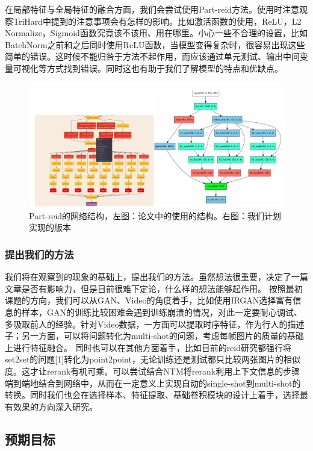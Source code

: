 在局部特征与全局特征的融合方面，我们会尝试使用Part-reid方法。使用时注意观察TriHard中提到的注意事项会有怎样的影响。比如激活函数的使用，ReLU，L2 Normalize，Sigmoid函数究竟该不该用、用在哪里。小心一些不合理的设置，比如BatchNorm之前和之后同时使用ReLU函数，当模型变得复杂时，很容易出现这些简单的错误。这时候不能归咎于方法不起作用，而应该通过单元测试、输出中间变量可视化等方式找到错误。同时这也有助于我们了解模型的特点和优缺点。

\begin{figure}
	\centering
	\captionsetup{width=.88\linewidth}
	\includegraphics[width=\linewidth,keepaspectratio]{data/kaitibaogao/vis3.png}
	\caption{\kaiti Part-reid的网络结构，左图：论文中的使用的结构。右图：我们计划实现的版本}
	\label{figure:vis3}
\end{figure}

\subsubsection{提出我们的方法}

我们将在观察到的现象的基础上，提出我们的方法。虽然想法很重要，决定了一篇文章是否有影响力，但是目前很难下定论，什么样的想法能够起作用。
按照最初课题的方向，我们可以从GAN、Video的角度着手，比如使用IRGAN选择富有信息的样本，GAN的训练比较困难会遇到训练崩溃的情况，对此一定要耐心调试、多吸取前人的经验。针对Video数据，一方面可以提取时序特征，作为行人的描述子；另一方面，可以将问题转化为multi-shot的问题，考虑每帧图片的质量的基础上进行特征融合。
同时也可以在其他方面着手，比如目前的reid研究都强行将set2set的问题[1]转化为point2point，无论训练还是测试都只比较两张图片的相似度。这才让rerank有机可乘。可以尝试结合NTM将rerank利用上下文信息的步骤端到端地结合到网络中，从而在一定意义上实现自动的single-shot到multi-shot的转换。同时我们也会在选择样本、特征提取、基础卷积模块的设计上着手，选择最有效果的方向深入研究。

\subsection{预期目标}

